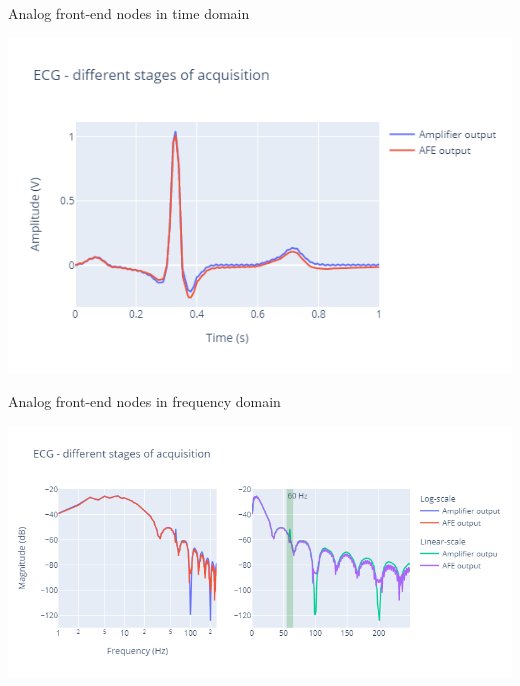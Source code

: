 \begin{frame}{Analog front-end nodes in time domain}
\begin{minipage}[c][0.5\textheight][c]{\linewidth}
\begin{center}
    \includegraphics[height=0.8\textheight]{images/AFE/afe2.png}  
\end{center}
\end{minipage}
\end{frame}
\begin{frame}{Analog front-end nodes in frequency domain}
\begin{minipage}[c][0.5\textheight][c]{\linewidth}
\begin{center}
    \includegraphics[height=0.8\textheight]{images/AFE/afe4.png}  
\end{center}
\end{minipage}
\end{frame}


